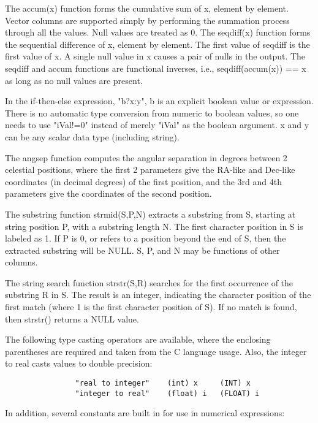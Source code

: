 \documentclass[11pt]{book}
\begin{document}
    The accum(x) function forms the cumulative sum of x, element by element.
    Vector columns are supported simply by performing the summation process
    through all the values.  Null values are treated as 0.  The seqdiff(x)
    function forms the sequential difference of x, element by element.
    The first value of seqdiff is the first value of x.  A single null
    value in x causes a pair of nulls in the output.  The seqdiff and
    accum functions are functional inverses, i.e., seqdiff(accum(x)) == x
    as long as no null values are present.

In the if-then-else expression, "b?x:y", b is an explicit boolean
value or expression.  There is no automatic type conversion from
numeric to boolean values, so one needs to use "iVal!=0" instead of
merely "iVal" as the boolean argument. x and y can be any scalar data
type (including string).

    The angsep function computes the angular separation in degrees
    between 2 celestial positions, where the first 2 parameters
    give the RA-like and Dec-like coordinates (in decimal degrees)
    of the first position, and the 3rd and 4th parameters give the
    coordinates of the second position.

The substring function strmid(S,P,N) extracts a substring from S,
starting at string position P, with a substring length N.  The first
character position in S is labeled as 1. If P is 0, or refers to a
position beyond the end of S, then the extracted substring will be
NULL.   S, P, and N may be functions of other columns.

The string search function strstr(S,R) searches for the first occurrence
of the substring R in S.  The result is an integer, indicating the
character position of the first match (where 1 is the first character
position of S).  If no match is found, then strstr() returns a NULL
value.

    The  following  type  casting  operators  are  available,  where the
    enclosing parentheses are required and taken  from  the  C  language
    usage. Also, the integer to real casts values to double precision:

\begin{verbatim}
                "real to integer"    (int) x     (INT) x
                "integer to real"    (float) i   (FLOAT) i
\end{verbatim}

    In addition, several constants are built in  for  use  in  numerical
    expressions:
\end{document}
